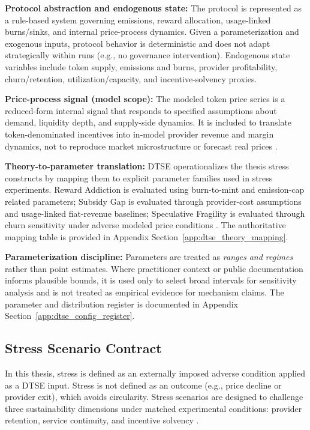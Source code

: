 \noindent\textbf{Protocol abstraction and endogenous state:}
The protocol is represented as a rule-based system governing emissions, reward allocation, usage-linked burns/sinks, and internal price-process dynamics. Given a parameterization and exogenous inputs, protocol behavior is deterministic and does not adapt strategically within runs (e.g., no governance intervention). Endogenous state variables include token supply, emissions and burns, provider profitability, churn/retention, utilization/capacity, and incentive-solvency proxies.

\noindent\textbf{Price-process signal (model scope):}
The modeled token price series is a reduced-form internal signal that responds to specified assumptions about demand, liquidity depth, and supply-side dynamics. It is included to translate token-denominated incentives into in-model provider revenue and margin dynamics, not to reproduce market microstructure or forecast real prices \cite{Morris2019, Collins2024}.

\noindent\textbf{Theory-to-parameter translation:}
DTSE operationalizes the thesis stress constructs by mapping them to explicit parameter families used in stress experiments. Reward Addiction is evaluated using burn-to-mint and emission-cap related parameters; Subsidy Gap is evaluated through provider-cost assumptions and usage-linked fiat-revenue baselines; Speculative Fragility is evaluated through churn sensitivity under adverse modeled price conditions \cite{Morris2019, Braakman2022}.
The authoritative mapping table is provided in Appendix Section~\ref{app:dtse_theory_mapping}.

\noindent\textbf{Parameterization discipline:}
Parameters are treated as \emph{ranges and regimes} rather than point estimates. Where practitioner context or public documentation informs plausible bounds, it is used only to select broad intervals for sensitivity analysis and is not treated as empirical evidence for mechanism claims.
The parameter and distribution register is documented in Appendix Section~\ref{app:dtse_config_register}.

\subsection{Stress Scenario Contract}
\label{sec:stress_scenarios}
In this thesis, stress is defined as an externally imposed adverse condition applied as a DTSE input. Stress is not defined as an outcome (e.g., price decline or provider exit), which avoids circularity. Stress scenarios are designed to challenge three sustainability dimensions under matched experimental conditions: provider retention, service continuity, and incentive solvency \cite{Morris2019, Braakman2022}.

